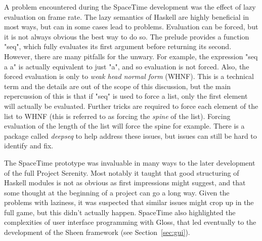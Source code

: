 A problem encountered during the SpaceTime development was the effect of lazy evaluation on frame rate. The lazy semantics of Haskell are highly beneficial in most ways, but can in some cases lead to problems. Evaluation can be forced, but it is not always obvious the best way to do so. The prelude provides a function "seq", which fully evaluates its first argument before returning its second. However, there are many pitfalls for the unwary. For example, the expression "seq a a" is actually equivalent to just "a", and so evaluation is not forced. Also, the forced evaluation is only to \emph{weak head normal form} (WHNF). This is a technical term and the details are out of the scope of this discussion, but the main repercussion of this is that if "seq" is used to force a list, only the first element will actually be evaluated. Further tricks are required to force each element of the list to WHNF (this is referred to as forcing the \emph{spine} of the list). Forcing evaluation of the length of the list will force the spine for example. There is a package called \emph{deepseq} to help address these issues, but issues can still be hard to identify and fix.

The SpaceTime prototype was invaluable in many ways to the later development of the full Project Serenity. Most notably it taught that good structuring of Haskell modules is not as obvious as first impressions might suggest, and that some thought at the beginning of a project can go a long way. Given the problems with laziness, it was suspected that similar issues might crop up in the full game, but this didn't actually happen. SpaceTime also highlighted the complexities of user interface programming with Gloss, that led eventually to the development of the Sheen framework (see Section~\ref{sec:gui}).
